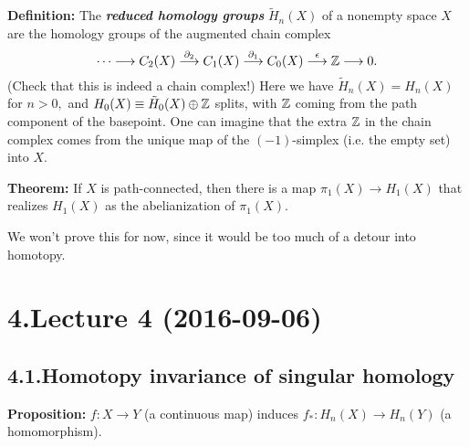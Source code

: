 \documentclass{article}
\begin{document}
\noindent{}\textbf{Definition:} The \textbf{\emph{reduced homology groups}} $\tilde{H}_n(X)$ of a nonempty space $X$ are the homology groups of the augmented chain complex%
\noindent\noindent\[%
\cdots \longrightarrow C_2(X)
\overset{\partial_2}{\longrightarrow} C_1(X)
\overset{\partial_1}{\longrightarrow} C_0(X)
\overset{\epsilon}{\longrightarrow} \Z
\longrightarrow 0.
\]%
\noindent{}(Check that this is indeed a chain complex!) Here we have $\tilde{H}_n(X) = H_n(X)$ for $n > 0,$ and $H_0(X) \equiv \tilde{H}_0(X) \oplus \mathbb{Z}$ splits, with $\mathbb{Z}$ coming from the path component of the basepoint. One can imagine that the extra $\mathbb{Z}$ in the chain complex comes from the unique map of the $(-1)$-simplex (i.e. the empty set) into $X.$

\textbf{Theorem:} If $X$ is path-connected, then there is a map $\pi_1(X) \to H_1(X)$ that realizes $H_1(X)$ as the abelianization of $\pi_1(X).$%

We won't prove this for now, since it would be too much of a detour into homotopy.%

\section{4.\hspace*{0.5em}Lecture 4 (2016-09-06)}\label{sec-lecture-4-2016-09-06}%

\subsection{4.1.\hspace*{0.5em}Homotopy invariance of singular homology}\label{sec-homotopy-invariance-of-singular-homology}%

\noindent{}\textbf{Proposition:} $f: X \to Y$ (a continuous map) induces $f_*: H_n(X) \to H_n(Y)$ (a homomorphism).%
\end{document}

